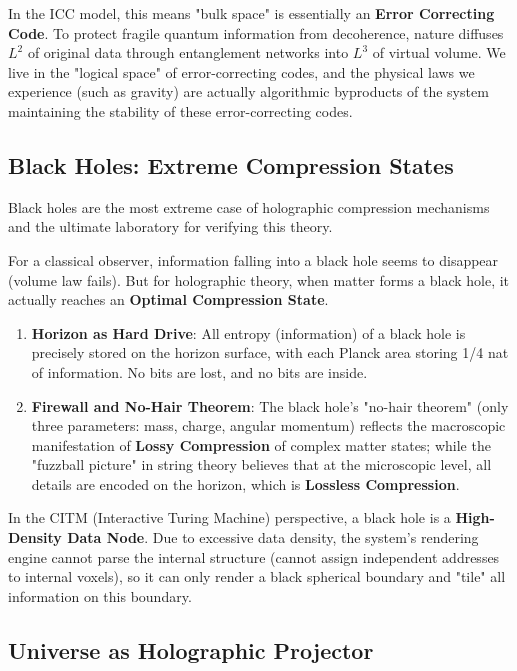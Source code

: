 In the ICC model, this means "bulk space" is essentially an \textbf{Error Correcting Code}. To protect fragile quantum information from decoherence, nature diffuses $L^2$ of original data through entanglement networks into $L^3$ of virtual volume. We live in the "logical space" of error-correcting codes, and the physical laws we experience (such as gravity) are actually algorithmic byproducts of the system maintaining the stability of these error-correcting codes.

\subsection{Black Holes: Extreme Compression States}

Black holes are the most extreme case of holographic compression mechanisms and the ultimate laboratory for verifying this theory.

For a classical observer, information falling into a black hole seems to disappear (volume law fails). But for holographic theory, when matter forms a black hole, it actually reaches an \textbf{Optimal Compression State}.

\begin{enumerate}
\item \textbf{Horizon as Hard Drive}: All entropy (information) of a black hole is precisely stored on the horizon surface, with each Planck area storing 1/4 nat of information. No bits are lost, and no bits are inside.

\item \textbf{Firewall and No-Hair Theorem}: The black hole's "no-hair theorem" (only three parameters: mass, charge, angular momentum) reflects the macroscopic manifestation of \textbf{Lossy Compression} of complex matter states; while the "fuzzball picture" in string theory believes that at the microscopic level, all details are encoded on the horizon, which is \textbf{Lossless Compression}.
\end{enumerate}

In the CITM (Interactive Turing Machine) perspective, a black hole is a \textbf{High-Density Data Node}. Due to excessive data density, the system's rendering engine cannot parse the internal structure (cannot assign independent addresses to internal voxels), so it can only render a black spherical boundary and "tile" all information on this boundary.

\subsection{Universe as Holographic Projector}

